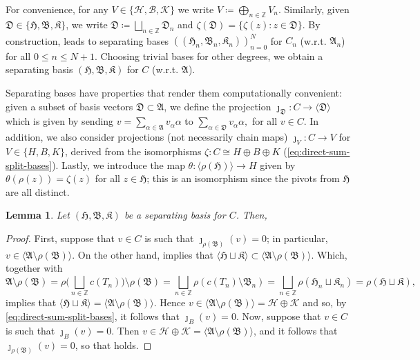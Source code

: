 \documentclass[11pt, table, nothms]{amsart}
\newtheorem{lemma}[theorem]{Lemma}
\theoremstyle{definition}
\newcommand{\B}{\mathcal{B}}
\newcommand{\Z}{\mathbb{Z}}
\newcommand{\cK}{\mathcal{K}}
\newcommand{\cH}{\mathcal{H}}
\newcommand{\fA}{\mathfrak{A}}
\newcommand{\fB}{\mathfrak{B}}
\newcommand{\fD}{\mathfrak{D}}
\newcommand{\fH}{\mathfrak{H}}
\newcommand{\fK}{\mathfrak{K}}
\begin{document}
{For convenience, for any $V \in \{ \cH, \B, \cK\}$ we write $V\coloneqq\bigoplus_{n\in \Z} V_n$.
Similarly, given $\fD \in \{ \fH, \fB, \fK\}$, we write $\fD\coloneqq \bigsqcup_{n\in \Z} \fD_n$ and $\zeta(\fD) = \{ \zeta(z) \colon z \in \fD\}$.
By construction,  leads to separating bases $((\fH_n, \fB_n, \fK_n))_{n=0}^N$ for $C_n$ (w.r.t. $\fA_n$) for all $0 \leq n \leq N+1$.
Choosing trivial bases for other degrees, we obtain a separating basis $(\fH, \fB, \fK)$ for $C$ (w.r.t. $\fA$).

Separating bases have properties that render them computationally convenient: 
given a subset of basis vectors $\fD \subset \fA$, we define the projection $\jmath_{\fD}\colon C \rightarrow \langle \fD\rangle$ which is given by sending 
$
v=\sum_{\alpha\in \fA} v_\alpha \alpha 
$
to 
$
\sum_{\alpha\in \fD} v_\alpha \alpha,
$
for all $v \in C$.
In addition, we also consider projections (not necessarily chain maps) $\jmath_V\colon C \rightarrow V$ for $V\in \{H, B, K\}$, derived from the isomorphisms $\zeta\colon C\cong H \oplus B \oplus K$ (\cref{eq:direct-sum-split-bases}). 
Lastly, we introduce the map $\theta \colon \langle \rho(\fH)\rangle \rightarrow H$ given by $\theta(\rho(z)) = \zeta(z)$ for all $z \in \fH$; this is an isomorphism since the pivots from $\fH$ are all distinct.
\begin{lemma}\label{lem:properties-separating-bases}
    Let $(\fH, \fB, \fK)$ be a separating basis for $C$.
    Then, 
\end{lemma}
\begin{proof}
    First, suppose that $v \in C$ is such that $\jmath_{\rho(\fB)}(v)=0$; in particular, $v \in \langle \fA \setminus \rho(\fB)\rangle$.
    On the other hand,  implies that $\langle \fH\sqcup \fK\rangle \subset \langle \fA \setminus \rho(\fB)\rangle$.
    Which, together with 
    \[
    \fA \setminus \rho(\fB) = \rho\big(\mbox{$\bigsqcup_{n\in \Z} c(T_n)\big) \setminus \rho(\fB)$} = 
    \mbox{$\bigsqcup_{n\in \Z}\rho(c(T_n)\setminus \fB_n)$} = 
    \mbox{$\bigsqcup_{n\in \Z}\rho(\fH_n \sqcup \fK_n)$}  = 
    \rho(\fH \sqcup \fK),
    \]
    implies that $\langle \fH\sqcup \fK\rangle = \langle \fA \setminus \rho(\fB)\rangle$. Hence $v \in \langle \fA \setminus \rho(\fB)\rangle=\cH \oplus \cK$ and so, by \cref{eq:direct-sum-split-bases}, it follows that $\jmath_{B}(v)=0$. 
    Now, suppose that $v \in C$ is such that $\jmath_{B}(v)=0$.
    Then $v \in \cH\oplus \cK=\langle \fA \setminus \rho(\fB)\rangle$, and it follows that $\jmath_{\rho(\fB)}(v)=0$, so that  holds. 


\end{proof}}
\end{document}
